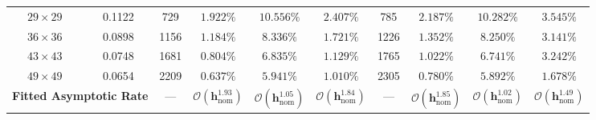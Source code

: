 \documentclass[preprint,12pt]{elsarticle}
\begin{document}
\begin{table}[!t]
{\begin{tabular}{cc|cccc|cccc}
            $29 \times 29$                                       & 0.1122                                       & 729                                                  & $1.922\%$                                                           & $10.556\%$                                          & $2.407\%$          & 785                                                 & $2.187\%$                                           & $10.282\%$                                          & $3.545\%$          \\
            $36 \times 36$                                       & 0.0898                                       & 1156                                                 & $1.184\%$                                                           & $8.336\%$                                           & $1.721\%$          & 1226                                                & $1.352\%$                                           & $8.250\%$                                           & $3.141\%$          \\
            $43 \times 43$                                       & 0.0748                                       & 1681                                                 & $0.804\%$                                                           & $6.835\%$                                           & $1.129\%$          & 1765                                                & $1.022\%$                                           & $6.741\%$                                           & $3.242\%$          \\
            $49 \times 49$                                       & 0.0654                                       & 2209                                                 & $0.637\%$                                                           & $5.941\%$                                           & $1.010\%$          & 2305                                                & $0.780\%$                                           & $5.892\%$                                           & $1.678\%$          \\
            \midrule
            \multicolumn{2}{c|}{\textbf{Fitted Asymptotic Rate}} & ---                                          & $\boldsymbol{\mathcal{O}(h_{\mathrm{nom}}^{1.93})}$  & $\boldsymbol{\mathcal{O}(h_{\mathrm{nom}}^{1.05})}$                 & $\boldsymbol{\mathcal{O}(h_{\mathrm{nom}}^{1.84})}$ & ---                & $\boldsymbol{\mathcal{O}(h_{\mathrm{nom}}^{1.85})}$ & $\boldsymbol{\mathcal{O}(h_{\mathrm{nom}}^{1.02})}$ & $\boldsymbol{\mathcal{O}(h_{\mathrm{nom}}^{1.49})}$                      \\

\end{tabular}}
\end{table}
\end{document}

